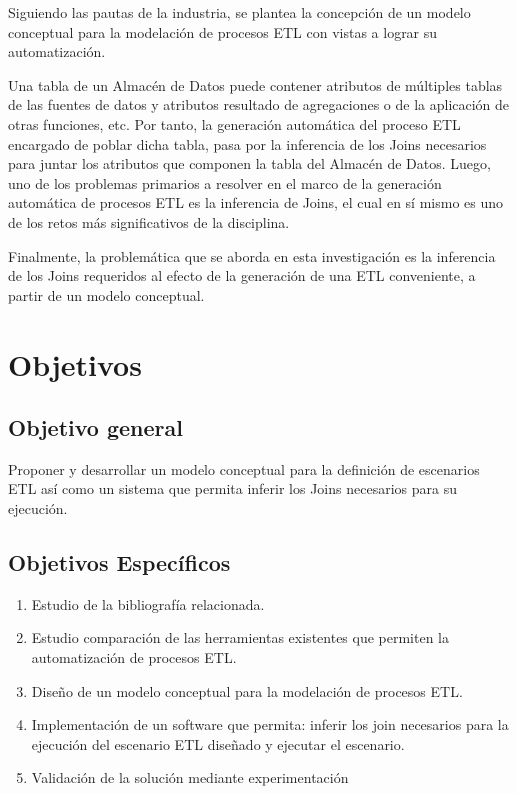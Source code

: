 Siguiendo las pautas de la industria, se plantea la concepci\'on de un modelo conceptual para la modelaci\'on de procesos 
ETL con vistas a lograr su automatización.

Una tabla de un Almacén de Datos puede contener atributos de m\'ultiples tablas de las fuentes de datos y 
atributos resultado de agregaciones o de la aplicaci\'on de otras funciones, etc. Por tanto, la generaci\'on autom\'atica 
del proceso ETL encargado de poblar dicha tabla, pasa por la inferencia de los Joins necesarios para juntar los atributos 
que componen la tabla del Almacén de Datos. Luego, uno de los problemas primarios a resolver en 
el marco de la generaci\'on autom\'atica de procesos ETL es la inferencia de Joins, el cual en s\'i mismo es uno de 
los retos m\'as significativos de la disciplina.

Finalmente, la problem\'atica que se aborda en esta investigación es la inferencia de los Joins requeridos 
al efecto de la generaci\'on de una ETL conveniente, a partir de un modelo conceptual.

\section{Objetivos}

\subsection{Objetivo general}

Proponer y desarrollar un modelo conceptual para la definici\'on de escenarios ETL as\'i como un sistema que permita 
inferir los Joins necesarios para su ejecución.

\subsection{Objetivos Espec\'ificos}

\begin{enumerate}
    \item Estudio de la bibliografía relacionada. 
    \item Estudio comparación de las herramientas existentes que permiten la automatización de procesos ETL.
    \item Diseño de un modelo conceptual para la modelación de procesos ETL.
    \item Implementación de un software que permita: inferir los join necesarios para la ejecución del escenario ETL diseñado y 
        ejecutar el escenario.
    \item Validación de la solución mediante experimentación
\end{enumerate}

